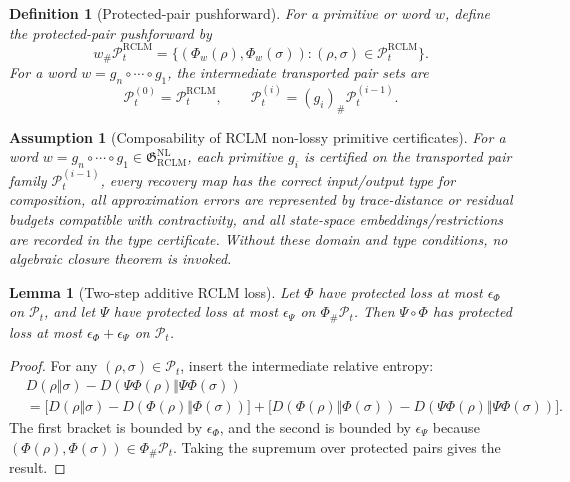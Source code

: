 \documentclass[11pt,a4paper]{article}
\newtheorem{lemma}[theorem]{Lemma}
\newtheorem{definition}[theorem]{Definition}
\newtheorem{assumption}[theorem]{Assumption}
\newcommand{\Pcal}{\mathcal P}
\newcommand{\RCLM}{\mathrm{RCLM}}
\newcommand{\NL}{\mathrm{NL}}
\begin{document}
\begin{definition}[Protected-pair pushforward]
\label{def:rclm-protected-pair-pushforward}
For a primitive or word \(w\), define the protected-pair pushforward by
\[
w_\#\Pcal_t^{\RCLM}
=
\{(\Phi_w(\rho),\Phi_w(\sigma)):(\rho,\sigma)\in\Pcal_t^{\RCLM}\}.
\]
For a word \(w=g_n\circ\cdots\circ g_1\), the intermediate transported pair sets are
\[
\Pcal_t^{(0)}=\Pcal_t^{\RCLM},
\qquad
\Pcal_t^{(i)}=(g_i)_\#\Pcal_t^{(i-1)}.
\]
\end{definition}

\begin{assumption}[Composability of RCLM non-lossy primitive certificates]
\label{ass:rclm-nl-primitive-composability}
For a word \(w=g_n\circ\cdots\circ g_1\in\mathfrak G_{\RCLM}^{\NL}\), each primitive \(g_i\) is certified on the transported pair family \(\Pcal_t^{(i-1)}\), every recovery map has the correct input/output type for composition, all approximation errors are represented by trace-distance or residual budgets compatible with contractivity, and all state-space embeddings/restrictions are recorded in the type certificate.  Without these domain and type conditions, no algebraic closure theorem is invoked.
\end{assumption}

\begin{lemma}[Two-step additive RCLM loss]
\label{lem:rclm-two-step-additive-loss}
Let \(\Phi\) have protected loss at most \(\epsilon_\Phi\) on \(\Pcal_t\), and let \(\Psi\) have protected loss at most \(\epsilon_\Psi\) on \(\Phi_\#\Pcal_t\).  Then \(\Psi\circ\Phi\) has protected loss at most \(\epsilon_\Phi+\epsilon_\Psi\) on \(\Pcal_t\).
\end{lemma}

\begin{proof}
For any \((\rho,\sigma)\in\Pcal_t\), insert the intermediate relative entropy:
\[
\begin{aligned}
&D(\rho\Vert\sigma)-D(\Psi\Phi(\rho)\Vert\Psi\Phi(\sigma))\\
&=\bigl[D(\rho\Vert\sigma)-D(\Phi(\rho)\Vert\Phi(\sigma))\bigr]
+\bigl[D(\Phi(\rho)\Vert\Phi(\sigma))-D(\Psi\Phi(\rho)\Vert\Psi\Phi(\sigma))\bigr].
\end{aligned}
\]
The first bracket is bounded by \(\epsilon_\Phi\), and the second is bounded by \(\epsilon_\Psi\) because \((\Phi(\rho),\Phi(\sigma))\in\Phi_\#\Pcal_t\).  Taking the supremum over protected pairs gives the result.
\end{proof}
\end{document}
